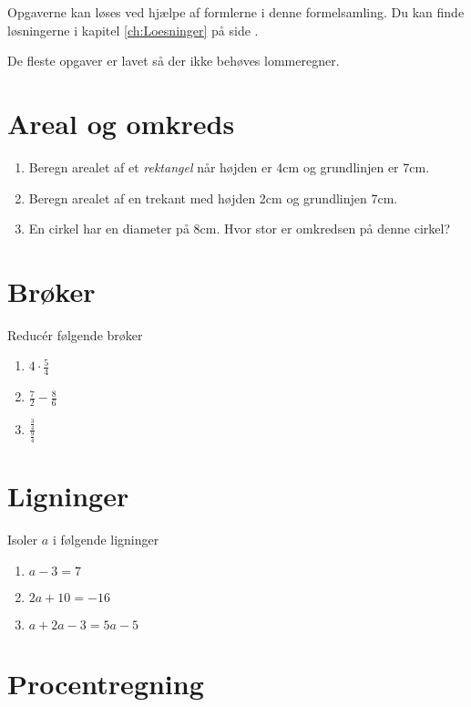 \documentclass[11pt,a5paper,fleqn,leqno]{book}
\begin{document}
Opgaverne kan løses ved hjælpe af formlerne i denne formelsamling. Du kan finde løsningerne i kapitel \ref{ch:Loesninger} på side \pageref{ch:Loesninger}.

De fleste opgaver er lavet så der ikke behøves lommeregner.

\newpage

\section{Areal og omkreds}

\begin{enumerate}
\item \label{op:areal_1} Beregn arealet af et \textit{rektangel} når højden er 4cm og grundlinjen er 7cm.
\item \label{op:areal_2} Beregn arealet af en trekant med højden 2cm og grundlinjen 7cm.
\item \label{op:areal_3} En cirkel har en diameter på 8cm. Hvor stor er omkredsen på denne cirkel?
\end{enumerate}

\section{Brøker}

Reducér følgende brøker

\begin{enumerate}
\item \label{op:broek_1} $4 \cdot \frac{5}{4}$
\item \label{op:broek_2} $\frac{7}{2} - \frac{8}{6}$
\item \label{op:broek_3} $\frac{\frac{3}{4}}{\frac{9}{4}}$
\end{enumerate}

\section{Ligninger}

Isoler $a$ i følgende ligninger

\begin{enumerate}
\item \label{op:ligning_1} $a-3=7$
\item \label{op:ligning_2} $2a+10=-16$
\item \label{op:ligning_3} $a+2a-3 = 5a -5$
\end{enumerate}

\section{Procentregning}
\end{document}
